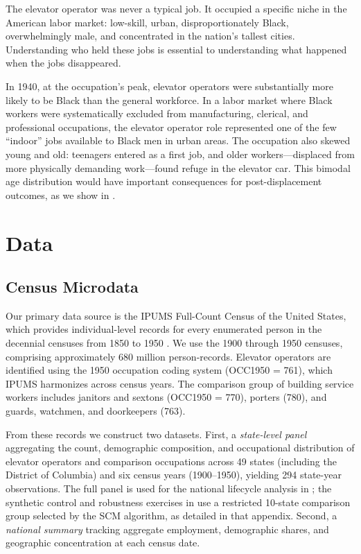 \documentclass[12pt]{article}
\begin{document}
The elevator operator was never a typical job. It occupied a specific niche in the American labor market: low-skill, urban, disproportionately Black, overwhelmingly male, and concentrated in the nation's tallest cities. Understanding who held these jobs is essential to understanding what happened when the jobs disappeared.

In 1940, at the occupation's peak, elevator operators were substantially more likely to be Black than the general workforce. In a labor market where Black workers were systematically excluded from manufacturing, clerical, and professional occupations, the elevator operator role represented one of the few ``indoor'' jobs available to Black men in urban areas. The occupation also skewed young and old: teenagers entered as a first job, and older workers---displaced from more physically demanding work---found refuge in the elevator car. This bimodal age distribution would have important consequences for post-displacement outcomes, as we show in .



\section{Data} \label{sec:data}

\subsection{Census Microdata}

Our primary data source is the IPUMS Full-Count Census of the United States, which provides individual-level records for every enumerated person in the decennial censuses from 1850 to 1950 \citep{ruggles2024}. We use the 1900 through 1950 censuses, comprising approximately 680 million person-records. Elevator operators are identified using the 1950 occupation coding system (OCC1950 = 761), which IPUMS harmonizes across census years. The comparison group of building service workers includes janitors and sextons (OCC1950 = 770), porters (780), and guards, watchmen, and doorkeepers (763).

From these records we construct two datasets. First, a \emph{state-level panel} aggregating the count, demographic composition, and occupational distribution of elevator operators and comparison occupations across 49 states (including the District of Columbia) and six census years (1900--1950), yielding 294 state-year observations. The full panel is used for the national lifecycle analysis in ; the synthetic control and robustness exercises in  use a restricted 10-state comparison group selected by the SCM algorithm, as detailed in that appendix. Second, a \emph{national summary} tracking aggregate employment, demographic shares, and geographic concentration at each census date.
\end{document}

